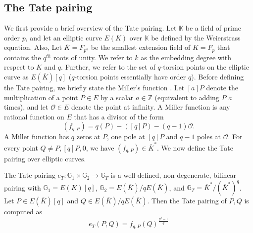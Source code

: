 \subsection{The Tate pairing}

We first provide a brief overview of the Tate pairing. Let $\mathbb{K}$ be a field of prime order $p$, and let an elliptic curve $E(K)$ over $\mathbb{K}$ be defined by the Weierstrass \cite{miller1986use} equation. Also, Let $\overline{K} = F_{p^k}$ be the smallest extension field of $K=F_p$ that contains the $q^{th}$ roots of unity. We refer to $k$ as the embedding degree with respect to $K$ and $q$. Further, we refer to the set of $q$-torsion points on the elliptic curve as $E(\overline{K})[q]$ ($q$-torsion points essentially have order $q$). Before defining the Tate pairing, we briefly state the Miller's function \cite{miller1986use}. Let $[a]P$ denote the multiplication of a point $P \in E$ by a scalar $a \in \mathbb{Z}$ (equivalent to adding $P$ $a$ times), and let $\mathcal{O} \in E$ denote the point at infinity. A Miller function is any rational function on $E$ that has a divisor of the form
  \begin{equation}
   (f_{q,P}) = q(P)-([q]P)-(q-1)\mathcal{O}.
  \end{equation}
A Miller function has $q$ zeros at $P$, one pole at $[q]P$ and $q-1$ poles at $\mathcal{O}$. For every point $Q\neq P, [q]P, \mathcal{0}$, we have $(f_{q,P})\in {\overline{K}}^{*}$. We now define the Tate pairing over elliptic curves. 

The Tate pairing $e_{T}:\mathbb{G}_1\times \mathbb{G}_2\longrightarrow \mathbb{G}_T$ is a well-defined, non-degenerate, bilinear pairing with $\mathbb{G}_1 = E(K)[q]$, $\mathbb{G}_2=E(\overline{K})/qE(\overline{K})$, and $\mathbb{G}_T = {\overline{K}}^*/({\overline{K}}^{*})^q$. Let $P \in E(\overline{K})[q]$ and $Q \in E(\overline{K})/qE(\overline{K})$. Then the Tate pairing of $P,Q$ is computed as 
\begin{equation}
 e_T(P,Q)=f_{q,P}(Q)^{\frac{p^k-1}{q}}
\end{equation}


